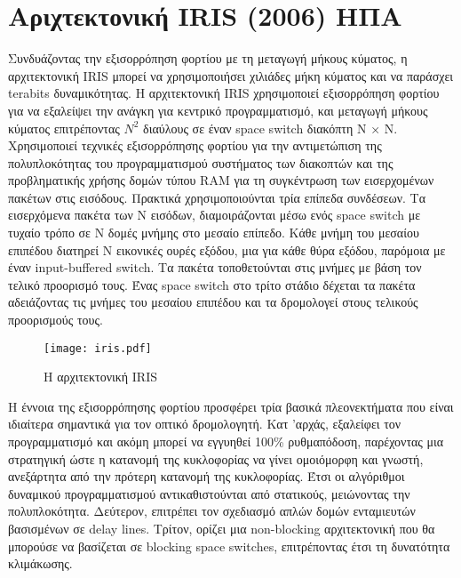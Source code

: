 ﻿
\section{Αριχτεκτονική IRIS (2006) ΗΠΑ}


Συνδυάζοντας την εξισορρόπηση φορτίου με τη μεταγωγή μήκους κύματος, η
αρχιτεκτονική IRIS μπορεί να χρησιμοποιήσει χιλιάδες μήκη κύματος και
να παράσχει terabits δυναμικότητας. Η αρχιτεκτονική IRIS χρησιμοποιεί
εξισορρόπηση φορτίου για να εξαλείψει την ανάγκη για κεντρικό
προγραμματισμό, και μεταγωγή μήκους κύματος επιτρέποντας $N^2$
διαύλους σε έναν space switch διακόπτη N × N. Xρησιμοποιεί τεχνικές
εξισορρόπησης φορτίου για την αντιμετώπιση της πολυπλοκότητας του
προγραμματισμού συστήματος των διακοπτών και της προβληματικής χρήσης
δομών τύπου RAM για τη συγκέντρωση των εισερχομένων πακέτων στις
εισόδους. Πρακτικά χρησιμοποιούνται τρία επίπεδα συνδέσεων. Τα
εισερχόμενα πακέτα των N εισόδων, διαμοιράζονται μέσω ενός space
switch με τυχαίο τρόπο σε Ν δομές μνήμης στο μεσαίο επίπεδο. Κάθε
μνήμη του μεσαίου επιπέδου διατηρεί Ν εικονικές ουρές εξόδου, μια για
κάθε θύρα εξόδου, παρόμοια με έναν input-buffered switch. Τα πακέτα
τοποθετούνται στις μνήμες με βάση τον τελικό προορισμό τους. Ένας
space switch στο τρίτο στάδιο δέχεται τα πακέτα αδειάζοντας τις μνήμες
του μεσαίου επιπέδου και τα δρομολογεί στους τελικούς προορισμούς
τους.

\begin{figure}[h]
  \centering
  \texttt{[image: iris.pdf]}
  \caption{Η αρχιτεκτονική IRIS}
  \label{fig:iris}
\end{figure}

H έννοια της εξισορρόπησης φορτίου προσφέρει τρία βασικά πλεονεκτήματα
που είναι ιδιαίτερα σημαντικά για τον οπτικό δρομολογητή. Κατ 'αρχάς,
εξαλείφει τον προγραμματισμό και ακόμη μπορεί να εγγυηθεί 100\%
ρυθμαπόδοση, παρέχοντας μια στρατηγική ώστε η κατανομή της κυκλοφορίας
να γίνει ομοιόμορφη και γνωστή, ανεξάρτητα από την πρότερη κατανομή
της κυκλοφορίας. Έτσι οι αλγόριθμοι δυναμικού προγραμματισμού
αντικαθιστούνται από στατικούς, μειώνοντας την
πολυπλοκότητα. Δεύτερον, επιτρέπει τον σχεδιασμό απλών δομών ενταμιευτών
βασισμένων σε delay lines. Τρίτον, ορίζει μια non-blocking
αρχιτεκτονική που θα μπορούσε να βασίζεται σε blocking space switches,
επιτρέποντας έτσι τη δυνατότητα κλιμάκωσης.

